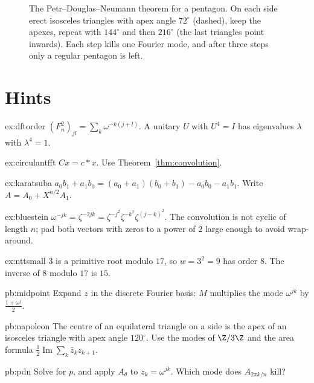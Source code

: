 \begin{figure}[ht]
\centering
{}
\caption{The Petr--Douglas--Neumann theorem for a pentagon. On each side erect isosceles triangles with apex angle $72^\circ$
(dashed), keep the apexes, repeat with $144^\circ$ and then $216^\circ$ (the last triangles point inwards). Each step kills
one Fourier mode, and after three steps only a regular pentagon is left.}
\label{fig:pdn}
\end{figure}

\section{Hints}

\begin{hint}{ex:dftorder}
$(F_n^2)_{jl}=\sum_k\omega^{-k(j+l)}$. A unitary $U$ with $U^4=I$ has eigenvalues $\lambda$ with $\lambda^4=1$.
\end{hint}
\begin{hint}{ex:circulantfft}
$Cx=c*x$. Use Theorem~\ref{thm:convolution}.
\end{hint}
\begin{hint}{ex:karatsuba}
$a_0b_1+a_1b_0=(a_0+a_1)(b_0+b_1)-a_0b_0-a_1b_1$. Write $A=A_0+X^{n/2}A_1$.
\end{hint}
\begin{hint}{ex:bluestein}
$\omega^{-jk}=\zeta^{-2jk}=\zeta^{-j^2}\zeta^{-k^2}\zeta^{(j-k)^2}$. The convolution is not cyclic of length $n$; pad both vectors with zeros to a power of $2$ large enough to avoid wrap-around.
\end{hint}
\begin{hint}{ex:nttsmall}
$3$ is a primitive root modulo $17$, so $w=3^2=9$ has order $8$. The inverse of $8$ modulo $17$ is $15$.
\end{hint}

\begin{hint}{pb:midpoint}
Expand $z$ in the discrete Fourier basis: $M$ multiplies the mode $\omega^{jk}$ by $\frac{1+\omega^j}2$.
\end{hint}

\begin{hint}{pb:napoleon}
The centre of an equilateral triangle on a side is the apex of an isosceles triangle with apex angle $120^\circ$. Use the
modes of $\Z/3\Z$ and the area formula $\frac12\operatorname{Im}\sum_k\bar z_kz_{k+1}$.
\end{hint}

\begin{hint}{pb:pdn}
Solve for $p$, and apply $A_\theta$ to $z_k=\omega^{jk}$. Which mode does $A_{2\pi k/n}$ kill?
\end{hint}

